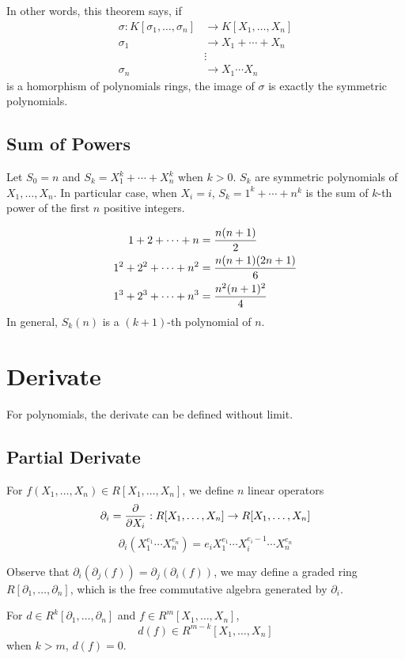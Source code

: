 \documentclass{article}
\begin{document}
In other words, this theorem says, if
\begin{align*}
  \sigma: K[\sigma_1, \dots, \sigma_n] &\to K[X_1, \dots, X_n] \\
  \sigma_1 &\to X_1 + \cdots + X_n \\
  &\vdots \\
  \sigma_n &\to X_1 \cdots X_n
\end{align*}
is a homorphism of polynomials rings, the image of $\sigma$ is
exactly the symmetric polynomials.

\subsection{Sum of Powers}
Let $S_0 = n$ and $S_k = X_1^k + \cdots + X_n^k$ when $k > 0$.
$S_k$ are symmetric polynomials of $X_1, \dots, X_n$.
In particular case, when $X_i = i$, $S_k = 1^k + \cdots + n^k$ is the sum of $k$-th power
of the first $n$ positive integers.

\begin{align*}
    1 + 2 + \cdots + n &= {n(n + 1) \over 2} \\
    1^2 + 2^2 + \cdots + n^2 &= {n(n + 1)(2n + 1) \over 6} \\
    1^3 + 2^3 + \cdots + n^3 &= {n^2(n + 1)^2 \over 4}
\end{align*}
In general, $S_k(n)$ is a $(k + 1)$-th polynomial of $n$.


\section{Derivate}
For polynomials, the derivate can be defined without limit.

\subsection{Partial Derivate}
For $f(X_1, \dots, X_n) \in R[X_1, \dots, X_n]$, we define $n$ linear operators
$$\partial_i = {\partial \over \partial X_i} : R[X_1, \dots, X_n] \to R[X_1, \dots, X_n]$$
$$\partial_i(X_1^{e_1} \cdots X_n^{e_n}) = e_i X_1^{e_1} \cdots X_i^{e_i-1} \cdots X_n^{e_n}$$

Observe that $\partial_i(\partial_j(f)) = \partial_j(\partial_i(f))$, we may define
a graded ring $R[\partial_1, \dots, \partial_n]$, which is the free commutative algebra generated by
$\partial_i$.

For $d \in R^k[\partial_1, \dots, \partial_n]$ and $f \in R^m[X_1, \dots, X_n]$,
$$d(f) \in R^{m-k}[X_1, \dots, X_n]$$
when $k > m$, $d(f) = 0$.
\end{document}
